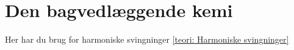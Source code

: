 \section{Den bagvedlæggende kemi}

Her har du brug for harmoniske svingninger \ref{teori: Harmoniske svingninger}
